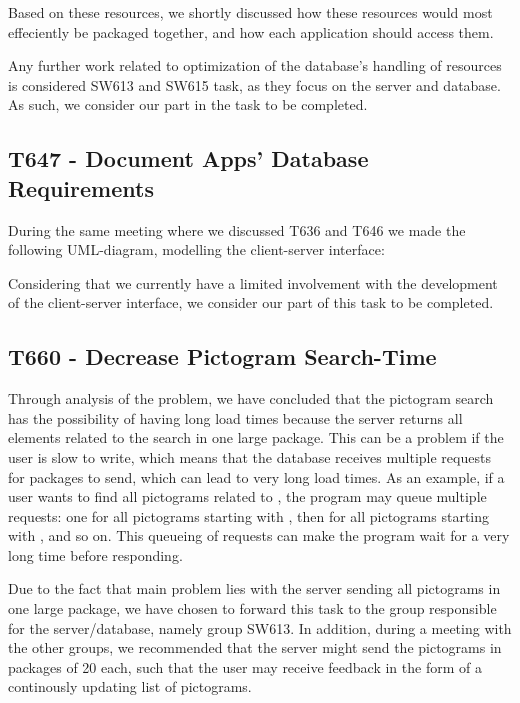 Based on these resources, we shortly discussed how these resources would most
effeciently be packaged together, and how each application should access
them.\nl

Any further work related to optimization of the database's handling of
resources is considered SW613 and SW615 task, as they focus on the server and
database. As such, we consider our part in the task to be completed.

\subsection{T647 - Document Apps' Database Requirements}
During the same meeting where we discussed T636 and T646 we made the
following UML-diagram, modelling the client-server interface:


Considering that we currently have a limited involvement with the development of
the client-server interface, we consider our part of this task to be completed.

\subsection{T660 - Decrease Pictogram Search-Time}
Through analysis of the problem, we have concluded that the pictogram search
has the possibility of having long load times because the server returns all
elements related to the search in one large package. This can be a problem if
the user is slow to write, which means that the database receives multiple
requests for packages to send, which can lead to very long load times. As an
example, if a user wants to find all pictograms related to , the
program may queue multiple requests: one for all pictograms starting with
, then for all pictograms starting with , and so on. This
queueing of requests can make the program wait for a very long time before
responding.\nl

Due to the fact that main problem lies with the server sending all pictograms in
one large package, we have chosen to forward this task to the group responsible
for the server/database, namely group SW613. In addition, during a meeting with
the other groups, we recommended that the server might send the pictograms in
packages of 20 each, such that the user may receive feedback in the form of a
continously updating list of pictograms.

